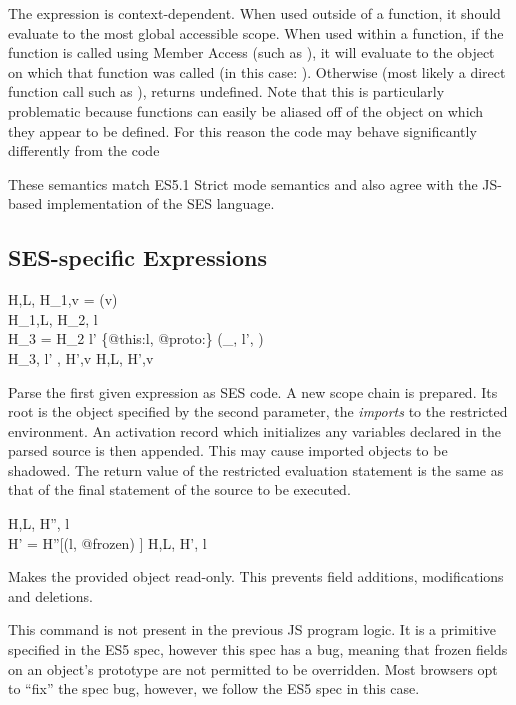 \documentclass[a4paper,notitlepage]{report}
\begin{document}
The  expression is context-dependent. When used
outside of a
function, it should evaluate to the most global accessible scope.
When used within a function, if the function is called using Member Access (such
as ), it
will evaluate to the object on which that function was called (in this case: ). Otherwise
(most likely a direct function call such as ),
 returns undefined. Note that this is particularly
problematic because functions can easily be aliased off of the object on which
they appear to be defined. For this reason the code 
may behave significantly differently from the code 

These semantics match ES5.1 Strict mode semantics and also agree with the
JS-based implementation of the SES language.

  \subsection{SES-specific Expressions}

  {H,L, \gevalsto H_1,v \qquad
    = \parse(v) \\
   H_1,L, \gevalsto H_2, l \\
   H_3 = H_2 \disju l' \pointsto \{@this:l, @proto:\nil\} \disju
     (\_, l', ) \\
   H_3, l' \cons [l],  \gevalsto H',v }
  {H,L, \evalsto H',v}

Parse the first given expression as SES code.
A new scope chain is prepared. Its root is the
object specified by the second parameter, the \emph{imports} to the restricted
environment.
An activation record which initializes any variables declared in the parsed
source is then appended. This may cause imported objects to be shadowed.
The return value of the restricted evaluation statement is the same as that of
the final statement of the source to be executed.

  {H,L, \gevalsto H'', l\\
   H' = H''[(l, @frozen) \pointsto \true]}
  {H,L, \evalsto H', l}

Makes the provided object read-only. This prevents field additions,
modifications and deletions.

This command is not present in the previous JS program logic. It is a primitive
specified in the ES5 spec, however this spec has a bug, meaning that frozen
fields on an object's prototype are not permitted to be overridden.
Most browsers opt to ``fix'' the spec bug, however, we follow the ES5 spec in
this case.
\end{document}
